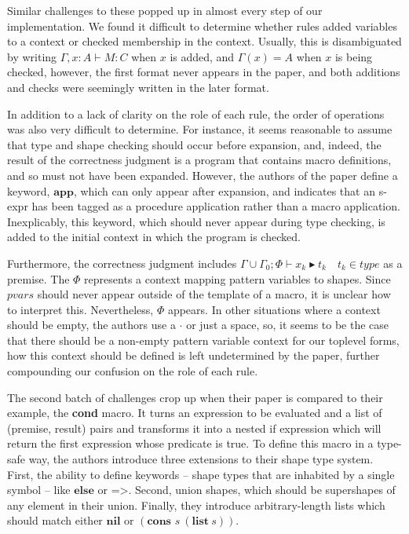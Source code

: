 \documentclass[11pt]{article}
\begin{document}
Similar challenges to these popped up in almost every step of our implementation. We found it difficult to determine whether rules added variables to a context or checked membership in the context. Usually, this is disambiguated by writing $\Gamma, x :A \vdash M :C$ when $x$ is added, and $\Gamma(x) = A$ when $x$ is being checked, however, the first format never appears in the paper, and both additions and checks were seemingly written in the later format. 

In addition to a lack of clarity on the role of each rule, the order of operations was also very difficult to determine. For instance, it seems reasonable to assume that type and shape checking should occur before expansion, and, indeed, the result of the correctness judgment is a program that contains macro definitions, and so must not have been expanded. However, the authors of the paper define a keyword, $\textbf{app}$, which can only appear after expansion, and indicates that an s-expr has been tagged as a procedure application rather than a macro application. Inexplicably, this keyword, which should never appear during type checking, is added to the initial context in which the program is checked. 

Furthermore, the correctness judgment includes $\Gamma\cup\Gamma_0; \Phi \vdash x_k \blacktriangleright t_k\quad t_k \in type$ as a premise. The $\Phi$ represents a context mapping pattern variables to shapes. Since $pvars$ should never appear outside of the template of a macro, it is unclear how to interpret this. Nevertheless, $\Phi$  appears. In other situations where a context should be empty, the authors use a $\cdot$ or just a space, so, it seems to be the case that there should be a non-empty pattern variable context for our toplevel forms, how this context should be defined is left undetermined by the paper, further compounding our confusion on the role of each rule.

The second batch of challenges crop up when their paper is compared to their example, the \textbf{cond} macro. It turns an expression to be evaluated and a list of (premise, result) pairs and transforms it into a nested if expression which will return the first expression whose predicate is true. To define this macro in a type-safe way, the authors introduce three extensions to their shape type system. First, the ability to define keywords -- shape types that are inhabited by a single symbol -- like $\textbf{else}$ or $\textbf{=>}$. Second, union shapes, which should be supershapes of any element in their union. Finally, they introduce arbitrary-length lists which should match either $\textbf{nil}$ or $(\textbf{cons }s\ (\textbf{list} \ s))$. 
\end{document}
